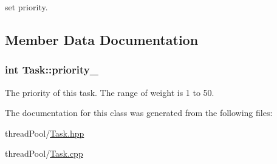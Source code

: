 set priority. 



\subsection{Member Data Documentation}
\subsubsection[{\texorpdfstring{priority\+\_\+}{priority_}}]{\setlength{\rightskip}{0pt plus 5cm}int Task\+::priority\+\_\+\hspace{0.3cm}{\ttfamily [protected]}}\hypertarget{classTask_ad7d1b58e73a2d716dabd08ab985a35f9}{}\label{classTask_ad7d1b58e73a2d716dabd08ab985a35f9}
The priority of this task. The range of weight is 1 to 50. 

The documentation for this class was generated from the following files\+:\begin{DoxyCompactItemize}
\item 
thread\+Pool/\hyperlink{Task_8hpp}{Task.\+hpp}\item 
thread\+Pool/\hyperlink{Task_8cpp}{Task.\+cpp}\end{DoxyCompactItemize}
